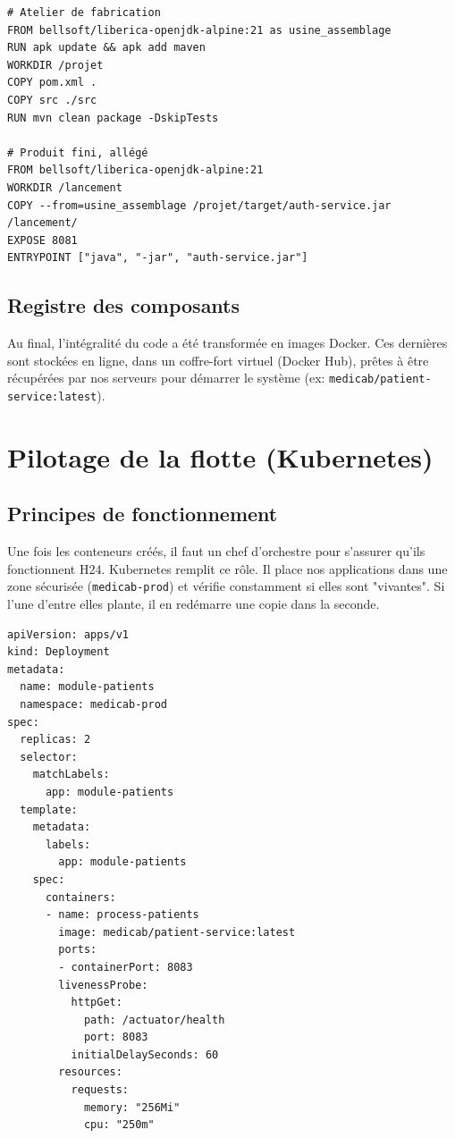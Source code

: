 \documentclass[final]{report}
\begin{document}
\begin{lstlisting}[style=dockerstyle, caption={Gabarit de création d'une image}, label={lst:dockerfile-auth}]
# Atelier de fabrication
FROM bellsoft/liberica-openjdk-alpine:21 as usine_assemblage
RUN apk update && apk add maven
WORKDIR /projet
COPY pom.xml .
COPY src ./src
RUN mvn clean package -DskipTests
 
# Produit fini, allégé
FROM bellsoft/liberica-openjdk-alpine:21
WORKDIR /lancement
COPY --from=usine_assemblage /projet/target/auth-service.jar /lancement/
EXPOSE 8081
ENTRYPOINT ["java", "-jar", "auth-service.jar"]
\end{lstlisting}
 
\subsection{Registre des composants}
Au final, l'intégralité du code a été transformée en images Docker. Ces dernières sont stockées en ligne, dans un coffre-fort virtuel (Docker Hub), prêtes à être récupérées par nos serveurs pour démarrer le système (ex: \texttt{medicab/patient-service:latest}).
 
\section{Pilotage de la flotte (Kubernetes)}
\subsection{Principes de fonctionnement}
Une fois les conteneurs créés, il faut un chef d'orchestre pour s'assurer qu'ils fonctionnent H24. Kubernetes remplit ce rôle. Il place nos applications dans une zone sécurisée (\texttt{medicab-prod}) et vérifie constamment si elles sont "vivantes". Si l'une d'entre elles plante, il en redémarre une copie dans la seconde.
 
\begin{lstlisting}[style=yamlstyle, caption={Fichier de configuration d'un module}, label={lst:deploy-yaml}]
apiVersion: apps/v1
kind: Deployment
metadata:
  name: module-patients
  namespace: medicab-prod
spec:
  replicas: 2
  selector:
    matchLabels:
      app: module-patients
  template:
    metadata:
      labels:
        app: module-patients
    spec:
      containers:
      - name: process-patients
        image: medicab/patient-service:latest
        ports:
        - containerPort: 8083
        livenessProbe:
          httpGet:
            path: /actuator/health
            port: 8083
          initialDelaySeconds: 60
        resources:
          requests:
            memory: "256Mi"
            cpu: "250m"
\end{lstlisting}
 
\end{document}
